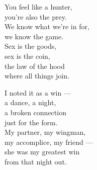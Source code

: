\begin{lyrics}
You feel like a hunter,\\
you’re also the prey.\\
We know what we’re in for,\\
we know the game.\\
Sex is the goods,\\
sex is the coin,\\
the law of the hood\\
where all things join.

I noted it as a win —\\
a dance, a night,\\
a broken connection\\
just for the form.\\
My partner, my wingman,\\
my accomplice, my friend —\\
she was my greatest win\\
from that night out.
\end{lyrics}

